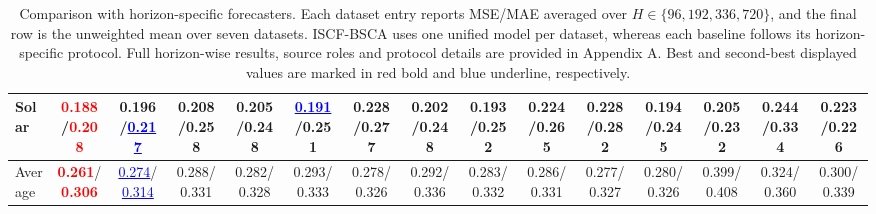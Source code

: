 \begin{table}[t]
{\begin{tabular}{l|cccccccccccccc}
Solar & \textcolor{red}{\textbf{0.188}}/\textcolor{red}{\textbf{0.208}} & 0.196/\textcolor{blue}{\underline{0.217}} & 0.208/0.258 & 0.205/0.248 & \textcolor{blue}{\underline{0.191}}/0.251 & 0.228/0.277 & 0.202/0.248 & 0.193/0.252 & 0.224/0.265 & 0.228/0.282 & 0.194/0.245 & 0.205/0.232 & 0.244/0.334 & 0.223/0.226 \\
\midrule
Average & \textcolor{red}{\textbf{0.261}}/\textcolor{red}{\textbf{0.306}} & \textcolor{blue}{\underline{0.274}}/\textcolor{blue}{\underline{0.314}} & 0.288/0.331 & 0.282/0.328 & 0.293/0.333 & 0.278/0.326 & 0.292/0.336 & 0.283/0.332 & 0.286/0.331 & 0.277/0.327 & 0.280/0.326 & 0.399/0.408 & 0.324/0.360 & 0.300/0.339 \\
\bottomrule
\end{tabular}%
}
\caption{Comparison with horizon-specific forecasters. Each dataset entry reports MSE/MAE averaged over $H\in\{96,192,336,720\}$, and the final row is the unweighted mean over seven datasets. ISCF-BSCA uses one unified model per dataset, whereas each baseline follows its horizon-specific protocol. Full horizon-wise results, source roles and protocol details are provided in Appendix A. Best and second-best displayed values are marked in red bold and blue underline, respectively.}
\label{tab:main_iscf_bsca}
\end{table}
